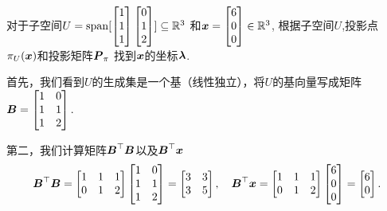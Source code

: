 \begin{example}[投影到二维子空间]
    对于子空间$U = \mathrm{span}[
        \begin{bmatrix} 1 \\ 1 \\ 1 \end{bmatrix}
        \begin{bmatrix} 0 \\ 1 \\ 2 \end{bmatrix}
    ] \subseteq \mathbb{R}^3$
    和$\boldsymbol{x} = \begin{bmatrix} 6 \\ 0 \\ 0 \end{bmatrix} \in \mathbb{R}^3$,
    根据子空间$U$,投影点$\pi_U(\boldsymbol{x})$和投影矩阵$\boldsymbol{P}_\pi$
    找到$\boldsymbol{x}$的坐标$\boldsymbol{\lambda}$.

    首先，我们看到$U$的生成集是一个基（线性独立），将$U$的基向量写成矩阵
    $\boldsymbol{B} = \begin{bmatrix}
        1 & 0 \\
        1 & 1 \\
        1 & 2 \\
    \end{bmatrix}.$

    第二，我们计算矩阵$\boldsymbol{B}^\top\boldsymbol{B}$以及$\boldsymbol{B}^\top\boldsymbol{x}$
    \begin{equation}
        \boldsymbol{B}^\top\boldsymbol{B} =
        \begin{bmatrix}
            1 & 1 & 1 \\
            0 & 1 & 2
        \end{bmatrix}
        \begin{bmatrix}
            1 & 0 \\
            1 & 1 \\
            1 & 2
        \end{bmatrix} =
        \begin{bmatrix}
            3 & 3 \\
            3 & 5
        \end{bmatrix},\quad
        \boldsymbol{B}^\top\boldsymbol{x} =
        \begin{bmatrix}
            1 & 1 & 1 \\
            0 & 1 & 2
        \end{bmatrix}
        \begin{bmatrix}
            6 \\ 0 \\ 0
        \end{bmatrix} =
        \begin{bmatrix} 6 \\ 0 \end{bmatrix}.
    \end{equation}


\end{example}

